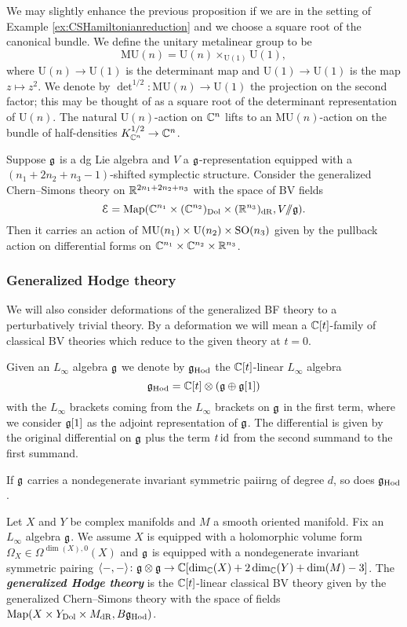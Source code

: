 \documentclass[10pt, oneside]{article}
\newcommand{\Hod}{\mathrm{Hod}}
\newcommand{\MU}{\mathrm{MU}}
\renewcommand{\U}{\mathrm{U}}
\newcommand{\ham}{/\!\!/}
\newcommand{\defterm}[1]{\textbf{\emph{#1}}}
\begin{document}
We may slightly enhance the previous proposition if we are in the setting of Example \ref{ex:CSHamiltonianreduction} and we choose a square root of the canonical bundle. We define the unitary metalinear group to be
\[\MU(n) = \U(n)\times_{\U(1)} \U(1),\]
where $\U(n)\rightarrow \U(1)$ is the determinant map and $\U(1)\rightarrow \U(1)$ is the map $z\mapsto z^2$. We denote by $\det^{1/2}\colon \MU(n)\rightarrow \U(1)$ the projection on the second factor; this may be thought of as a square root of the determinant representation of $\U(n)$. The natural $\U(n)$-action on $\mathbb C^n$ lifts to an $\MU(n)$-action on the bundle of half-densities $K_{\mathbb C^n}^{1/2}\rightarrow \mathbb C^n$.

\begin{prop}
Suppose $\mathfrak g$ is a dg Lie algebra and $V$ a $\mathfrak g$-representation equipped with a $(n_1+2n_2+n_3-1)$-shifted symplectic structure. Consider the generalized Chern--Simons theory on $\mathbb R^{2n_1+2n_2+n_3}$ with the space of BV fields
\[\cE = \map(\CC^{n_1}\times (\CC^{n_2})_{\mr{Dol}}\times (\RR^{n_3})_{\mr{dR}}, V\ham\fg).\]
Then it carries an action of $\MU(n_1)\times \U(n_2)\times \SO(n_3)$ given by the pullback action on differential forms on $\mathbb C^{n_1}\times \mathbb C^{n_2}\times \mathbb R^{n_3}$.
\end{prop}

\subsubsection{Generalized Hodge theory}

We will also consider deformations of the generalized BF theory to a perturbatively trivial theory. By a deformation we will mean a $\mathbb C[t]$-family of classical BV theories which reduce to the given theory at $t=0$.

Given an $L_\infty$ algebra $\mathfrak g$ we denote by $\fg_{\Hod}$ the $\mathbb C[t]$-linear $L_\infty$ algebra
\[\fg_{\Hod} = \CC[t]\otimes (\fg\oplus \fg[1])\]
with the $L_\infty$ brackets coming from the $L_\infty$ brackets on $\mathfrak g$ in the first term, where we consider $\mathfrak g[1]$ as the adjoint representation of $\mathfrak g$. The differential is given by the original differential on $\mathfrak g$ plus the term $t\operatorname{id}$ from the second summand to the first summand.

If $\mathfrak g$ carries a nondegenerate invariant symmetric paiirng of degree $d$, so does $\fg_{\Hod}$.

\begin{definition}
Let $X$ and $Y$ be complex manifolds and $M$ a smooth oriented manifold. Fix an $L_\infty$ algebra $\mathfrak g$. We assume $X$ is equipped with a holomorphic volume form $\Omega_X \in\Omega^{\dim(X), 0}(X)$ and $\mathfrak g$ is equipped with a nondegenerate invariant symmetric pairing $\langle-, -\rangle\colon \mathfrak g\otimes\mathfrak g\rightarrow \mathbb C[\dim_\mathbb C(X) + 2\dim_\mathbb C(Y) + \dim(M) - 3]$. The \defterm{generalized Hodge theory} is the $\mathbb C[t]$-linear classical BV theory given by the generalized Chern--Simons theory with the space of fields $\map(X\times Y_{\mr{Dol}}\times M_{\mr{dR}}, B \fg_\Hod)$.
\end{definition}
\end{document}
